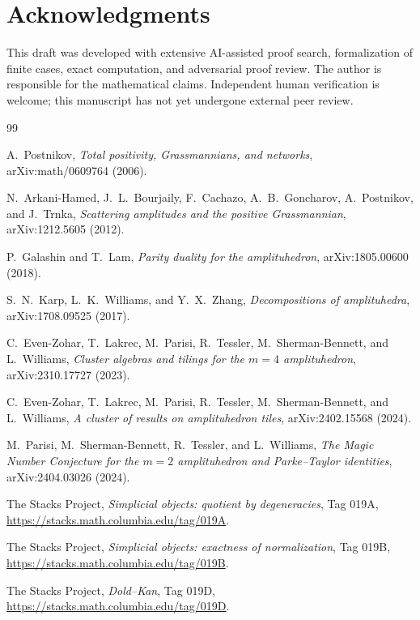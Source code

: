 \documentclass[11pt]{article}
\newcommand{\1}{\mathbf 1}
\begin{document}
\section*{Acknowledgments}
This draft was developed with extensive AI-assisted proof search,
formalization of finite cases, exact computation, and adversarial proof
review.  The author is responsible for the mathematical claims.
Independent human verification is welcome; this manuscript has not yet
undergone external peer review.

\begin{thebibliography}{99}

A.~Postnikov,
\emph{Total positivity, Grassmannians, and networks},
arXiv:math/0609764 (2006).

N.~Arkani-Hamed, J.~L.~Bourjaily, F.~Cachazo, A.~B.~Goncharov,
A.~Postnikov, and J.~Trnka,
\emph{Scattering amplitudes and the positive Grassmannian},
arXiv:1212.5605 (2012).

P.~Galashin and T.~Lam,
\emph{Parity duality for the amplituhedron},
arXiv:1805.00600 (2018).

\begingroup\raggedright
S.~N.~Karp, L.~K.~Williams, and Y.~X.~Zhang,
\emph{Decompositions of amplituhedra},
arXiv:1708.09525 (2017).
\par\endgroup

C.~Even-Zohar, T.~Lakrec, M.~Parisi, R.~Tessler,
M.~Sherman-Bennett, and L.~Williams,
\emph{Cluster algebras and tilings for the $m=4$ amplituhedron},
arXiv:2310.17727 (2023).

C.~Even-Zohar, T.~Lakrec, M.~Parisi, R.~Tessler,
M.~Sherman-Bennett, and L.~Williams,
\emph{A cluster of results on amplituhedron tiles},
arXiv:2402.15568 (2024).

M.~Parisi, M.~Sherman-Bennett, R.~Tessler, and L.~Williams,
\emph{The Magic Number Conjecture for the $m=2$ amplituhedron and
Parke--Taylor identities},
arXiv:2404.03026 (2024).

The Stacks Project,
\emph{Simplicial objects: quotient by degeneracies},
Tag 019A, \url{https://stacks.math.columbia.edu/tag/019A}.

The Stacks Project,
\emph{Simplicial objects: exactness of normalization},
Tag 019B, \url{https://stacks.math.columbia.edu/tag/019B}.

The Stacks Project,
\emph{Dold--Kan},
Tag 019D, \url{https://stacks.math.columbia.edu/tag/019D}.

\end{thebibliography}
\end{document}

